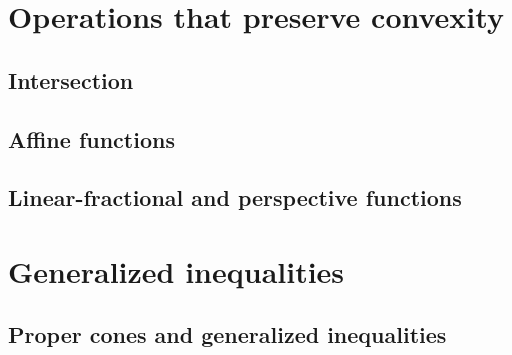 \section{Operations that preserve convexity}

\subsection{Intersection}
\begin{example}
\end{example}
\begin{example}
\end{example}

\subsection{Affine functions}
\begin{example}
\end{example}
\begin{example}
\end{example}
\begin{example}
\end{example}
\begin{example}
\end{example}

\subsection{Linear-fractional and perspective functions}
\begin{remark}
\end{remark}
\begin{remark}
\end{remark}
\begin{example}
\end{example}

\section{Generalized inequalities}

\subsection{Proper cones and generalized inequalities}
\begin{example}
\end{example}
\begin{example}
\end{example}
\begin{example}
\end{example}

